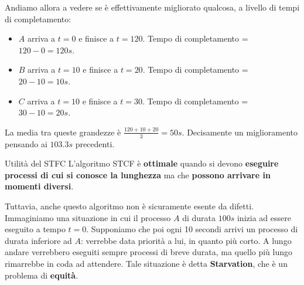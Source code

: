 \documentclass[12pt]{report}
\begin{document}
	Andiamo allora a vedere se è effettivamente migliorato qualcosa, a livello di tempi di completamento:
	\begin{itemize}
		\item $A$ arriva a $t=0$ e finisce a $t = 120$. Tempo di completamento = $120-0=120s$.
		
		\item $B$ arriva a $t=10$ e finisce a $t = 20$. Tempo di completamento = $20-10=10s$.
		
		\item $C$ arriva a $t=10$ e finisce a $t = 30$. Tempo di completamento = $30-10=20s$.
	\end{itemize}
	La media tra queste grandezze è $\frac{120+10+20}{3} = 50s$. Decisamente un miglioramento pensando ai $103.3s$ precedenti.
	
	\begin{osservazione}{Utilità del STFC}{}
		L'algoritmo STCF è \textbf{ottimale} quando si devono \textbf{eseguire processi di cui si conosce la lunghezza} ma che \textbf{possono arrivare in momenti diversi}.
	\end{osservazione}
	
	Tuttavia, anche questo algoritmo non è sicuramente esente da difetti. Immaginiamo una situazione in cui il processo $A$ di durata $100s$ inizia ad essere eseguito a tempo $t=0$. Supponiamo che poi ogni 10 secondi arrivi un processo di durata inferiore ad $A$: verrebbe data priorità a lui, in quanto più corto. A lungo andare verrebbero eseguiti sempre processi di breve durata, ma quello più lungo rimarrebbe in coda ad attendere. Tale situazione è detta \textbf{Starvation}, che è un problema di \textbf{equità}.
	
\end{document}
